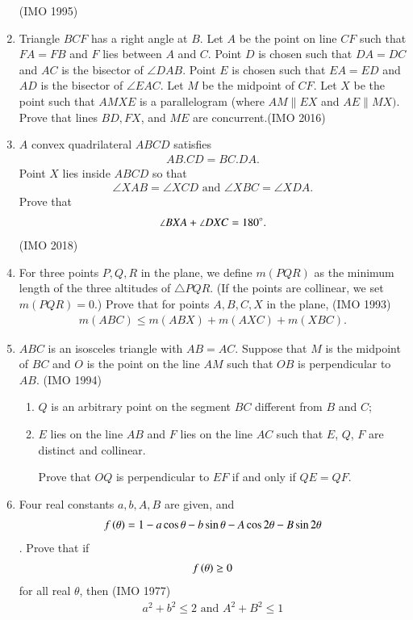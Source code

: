 \begin{enumerate}[label=\thesubsection.\arabic*,ref=\thesubsection.\theenumi]
	\hfill (IMO  1995)
 \item Triangle $BCF$ has a right angle at $B$. Let $A$ be the point on line $CF$ such that $FA=FB$ and $F$ lies between $A$ and $C$. Point $D$ is chosen such that $DA = DC$ and $AC$ is the bisector of $\angle DAB$. Point $E$ is chosen such that $EA= ED$ and $AD$ is the bisector of $\angle EAC$. Let $M$ be the midpoint of $CF$. Let $X$ be the point such that $AMXE$ is a parallelogram (where $AM \parallel EX$ and $AE \parallel MX)$. Prove that lines $BD, FX$, and $ME$ are concurrent.\hfill (IMO  2016)
\item $A$ convex quadrilateral $ABCD$ satisfies \begin{align*}AB.CD=BC.DA.\end{align*} Point $X$ lies inside $ABCD$ so that \begin{align*}\angle XAB=\angle XCD \text{ and } \angle XBC=\angle XDA.    \end{align*} Prove that\begin{align*}\angle BXA+\angle DXC=180\degree.\end{align*}\hfill (IMO  2018)
\item For three points $P, Q, R$ in the plane, we define $m(PQR)$ as the minimum length of the three altitudes of $\triangle PQR$. (If the points are collinear, we set $m(PQR) = 0$.)                                                                           
  Prove that for points $A, B, C, X$ in the plane,
 \hfill(IMO  1993)
\begin{align*}
                                                     m(ABC) \leq m(ABX) + m(AXC) + m(XBC).
\end{align*}
\item $ABC$ is an isosceles triangle with $AB = AC$. Suppose that  
$M$ is the midpoint of $BC$ and $O$ is the point on the line $AM$ such that $OB$ is perpendicular to $AB$.
\hfill(IMO  1994)
\begin{enumerate}
\item $Q$ is an arbitrary point on the segment $BC$ different from $B$ and $C$;                           
\item $E$ lies on the line $AB$ and $F$ lies on the line $AC$ such that $E$, $Q$, $F$ are distinct and collinear.
 
		 Prove that $OQ$ is perpendicular to $EF$ if and only if $QE=QF$.    
\end{enumerate}
%
\item Four real constants $a, b, A, B$ are given, and \begin{align*}
f\left(\theta\right) = 1 - a\cos\theta - b \sin \theta     - A \cos 2\theta - B \sin 2\theta  
\end{align*}. Prove that if 
\begin{align*}f\left(\theta\right) \ge 0 
	\end{align*} for all real $\theta$, then
(IMO  1977)
\begin{align*} a^{2} + b^{2} \leq 2 \text{ and } A^{2} + B^{2} \leq  1 
\end{align*}\hfill
\end{enumerate}
